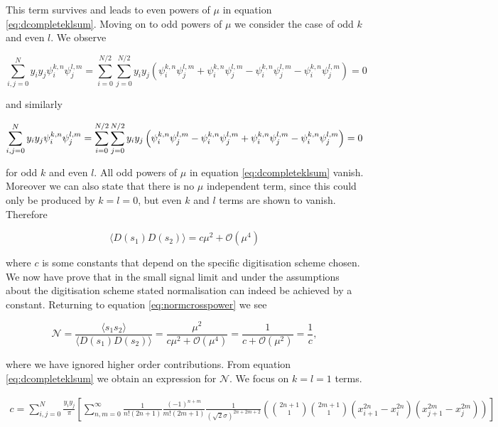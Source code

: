 \documentclass[apj]{emulateapj}
\begin{document}
This term survives and leads to even powers of $\mu$ in equation \ref{eq:dcompleteklsum}. Moving on to odd powers of $\mu$ we consider the case of odd $k$ and even $l$. We observe

\begin{equation}
\sum_{i,j = 0}^N y_i y_j \psi_i^{k, n} \psi_j^{l, m} = \sum_{i = 0}^{N/2}\sum_{j = 0}^{N/2} y_i y_j \left( \psi_i^{k, n} \psi_j^{l, m} + \psi_{i}^{k, n} \psi_j^{l, m} - \psi_i^{k, n} \psi_{j}^{l, m} - \psi_{i}^{k, n} \psi_{j}^{l, m} \right) = 0
\end{equation}

and similarly

\begin{equation}
\sum_{i,j = 0}^N y_i y_j \psi_i^{k, n} \psi_j^{l, m} = \sum_{i = 0}^{N/2}\sum_{j = 0}^{N/2} y_i y_j \left( \psi_i^{k, n} \psi_j^{l, m} - \psi_{i}^{k, n} \psi_j^{l, m} + \psi_i^{k, n} \psi_{j}^{l, m} - \psi_{i}^{k, n} \psi_{j}^{l, m} \right) = 0\\
\end{equation}

for odd $k$ and even $l$. All odd powers of $\mu$ in equation \ref{eq:dcompleteklsum} vanish. Moreover we can also state that there is no $\mu$ independent term, since this could only be produced by $k=l=0$, but even $k$ and $l$ terms are shown to vanish. Therefore

\begin{equation}
\langle D(s_1) D(s_2) \rangle = c \mu^2 + \mathcal{O}(\mu^4)
\end{equation}

where $c$ is some constants that depend on the specific digitisation scheme chosen. We now have prove that in the small signal limit and under the assumptions about the digitisation scheme stated normalisation can indeed be achieved by a constant. Returning to equation \ref{eq:normcrosspower} we see

\begin{equation}
\mathcal{N}  = \frac{\langle s_1 s_2 \rangle}{\langle D(s_1) D(s_2) \rangle} = \frac{\mu^2}{c \mu^2 + \mathcal{O}(\mu^4)} = \frac{1}{c + \mathcal{O}(\mu^2)} = \frac{1}{c},
\end{equation}

where we have ignored higher order contributions. From equation \ref{eq:dcompleteklsum} we obtain an expression for $\mathcal{N}$. We focus on $k=l=1$ terms.

\begin{equation}
\begin{aligned}
c = \sum_{i,j=0}^N  \frac{y_i y_j}{\pi} \left[ \sum_{n,m = 0}^\infty \frac{1}{n! (2n+1)} \frac{(-1)^{n+m}}{m! (2m+1)} \frac{1}{(\sqrt{2}\sigma)^{2n+2m+2}} \left( {2n+1 \choose 1} {2m+1 \choose 1} ( x_{i+1}^{2n} - x_{i}^{2n} ) ( x_{j+1}^{2m} - x_{j}^{2m} ) \right) \right]
\end{aligned}
\end{equation}
\end{document}
